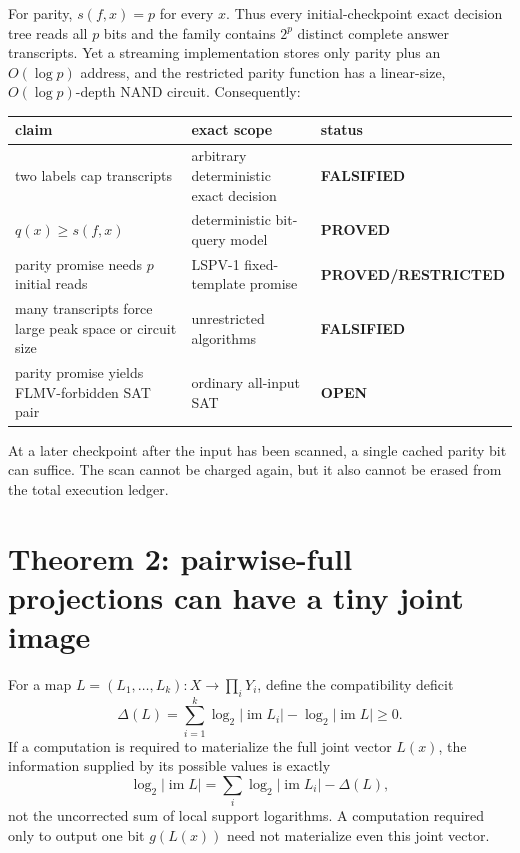\documentclass[11pt]{article}
\newcommand{\status}[1]{\textbf{#1}}
\begin{document}
For parity, $s(f,x)=p$ for every $x$.  Thus every initial-checkpoint exact
decision tree reads all $p$ bits and the family contains $2^p$ distinct complete
answer transcripts.  Yet a streaming implementation stores only parity plus an
$O(\log p)$ address, and the restricted parity function has a linear-size,
$O(\log p)$-depth NAND circuit.  Consequently:
\begin{center}
\begin{tabularx}{0.95\linewidth}{@{}lXl@{}}
\toprule
claim & exact scope & status\\
\midrule
two labels cap transcripts & arbitrary deterministic exact decision & \status{FALSIFIED}\\
$q(x)\ge s(f,x)$ & deterministic bit-query model & \status{PROVED}\\
parity promise needs $p$ initial reads & LSPV-1 fixed-template promise & \status{PROVED/RESTRICTED}\\
many transcripts force large peak space or circuit size & unrestricted algorithms & \status{FALSIFIED}\\
parity promise yields FLMV-forbidden SAT pair & ordinary all-input SAT & \status{OPEN}\\
\bottomrule
\end{tabularx}
\end{center}
At a later checkpoint after the input has been scanned, a single cached parity
bit can suffice.  The scan cannot be charged again, but it also cannot be
erased from the total execution ledger.

\section*{Theorem 2: pairwise-full projections can have a tiny joint image}
For a map $L=(L_1,\ldots,L_k):X\to\prod_iY_i$, define the compatibility deficit
\[
  \Delta(L)=\sum_{i=1}^k\log_2|\operatorname{im}L_i|
     -\log_2|\operatorname{im}L|\ge0.
\]
If a computation is required to materialize the full joint vector $L(x)$, the
information supplied by its possible values is exactly
\[
  \log_2|\operatorname{im}L|
  =\sum_i\log_2|\operatorname{im}L_i|-\Delta(L),
\]
not the uncorrected sum of local support logarithms.  A computation required
only to output one bit $g(L(x))$ need not materialize even this joint vector.
\end{document}
